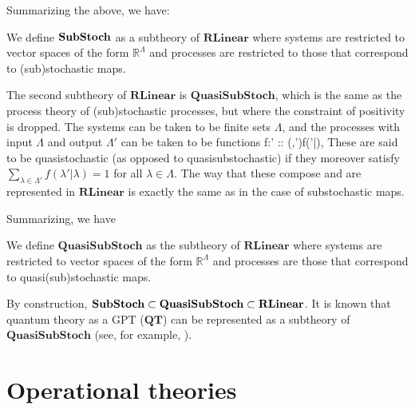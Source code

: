 \documentclass[10pt,twocolumn,aps,groupedaddress,nofootinbib]{revtex4}
\newcommand\RL{\mathbf{RLinear}}
\newcommand\QSS{\mathbf{QuasiSubStoch}}
\newcommand\SubS{\bf{SubStoch}}
\begin{document}
Summarizing the above, we have:
\begin{example}[$\SubS$]
We define $\SubS$ as a subtheory of $\RL$ where systems are restricted to vector spaces of the form $\mathds{R}^\Lambda$ and processes are restricted to those that correspond to (sub)stochastic maps.
\end{example}

The second subtheory of $\RL$ is $\QSS$, which is the same as the process theory of (sub)stochastic processes, but where the constraint of positivity is dropped. The systems can be taken to be finite sets $\Lambda$, and the processes with input $\Lambda$ and output $\Lambda'$ can be taken to be
functions
\beq
f:\Lambda\times \Lambda' \to {} :: (\lambda,\lambda')\mapsto f(\lambda'|\lambda),
\eeq
These are said to be quasistochastic (as opposed to quasisubstochastic) if they moreover satisfy  $\sum_{\lambda\in\Lambda'}f(\lambda'|\lambda) = 1$ for all $\lambda\in\Lambda$. The way that these compose and are represented in $\RL$ is exactly the same as in the case of substochastic maps.

Summarizing, we have
\begin{example}[$\QSS$]
We define $\QSS$ as the subtheory of $\RL$ where systems are restricted to vector spaces of the form $\mathds{R}^\Lambda$ and processes are those that correspond to quasi(sub)stochastic maps.
\end{example}

By construction, $\SubS \subset \QSS \subset \RL$. It is known that quantum theory as a GPT ($\mathbf{QT}$) can be represented as a subtheory of $\QSS$ (see, for example, \cite{van2017quantum}).

\section{Operational theories}
\end{document}
